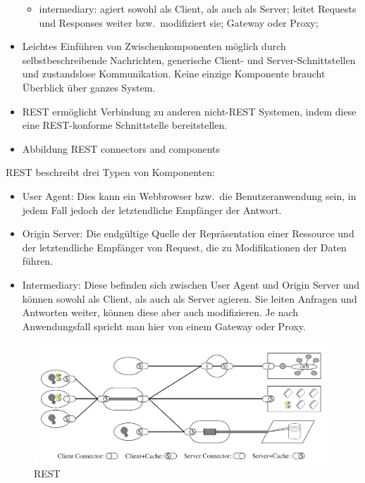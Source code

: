 \begin{itemize}
\begin{itemize}
    \item intermediary: agiert sowohl als Client, als auch als Server; leitet Requests und Responses weiter bzw.\ modifiziert sie; Gateway oder Proxy;
  \end{itemize}
  \item Leichtes Einführen von Zwischenkomponenten möglich durch selbstbeschreibende Nachrichten, generische Client- und Server-Schnittstellen und zustandslose Kommunikation. Keine einzige Komponente braucht Überblick über ganzes System.
  \item REST ermöglicht Verbindung zu anderen nicht-REST Systemen, indem diese eine REST-konforme Schnittstelle bereitstellen.
  \item Abbildung REST connectors and components
\end{itemize}
REST beschreibt drei Typen von Komponenten:\cite[vgl.][96]{REST}
\begin{itemize}
  \item User Agent:
  Dies kann ein Webbrowser bzw.\ die Benutzeranwendung sein, in jedem Fall jedoch der letztendliche Empfänger der Antwort.
  \item Origin Server:
  Die endgültige Quelle der Repräsentation einer Ressource und der letztendliche Empfänger von Request, die zu Modifikationen der Daten führen.
  \item Intermediary:
  Diese befinden sich zwischen User Agent und Origin Server und können sowohl als Client, als auch als Server agieren. Sie leiten Anfragen und Antworten weiter, können diese aber auch modifizieren. Je nach Anwendungsfall spricht man hier von einem Gateway oder Proxy.
\end{itemize}

\begin{figure}[h]
  \centering
  \includegraphics[width=\linewidth]{../Kapitel/Grafiken/REST-dissertation.png}
  \caption{REST}
  \label{img:REST-diss}
\end{figure}

